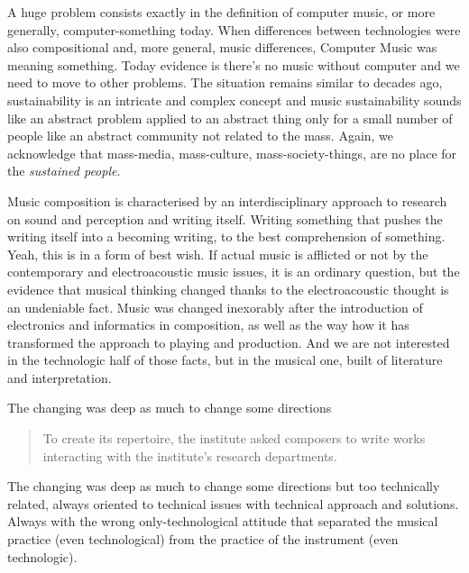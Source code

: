 \documentclass[twoside,a4paper]{article}
\begin{document}
A huge problem consists exactly in the definition of computer music, or more generally, computer-something today. When differences between technologies were also compositional and, more general, music differences, Computer Music was meaning something. Today evidence is there's no music without computer and we need to move to other problems. The situation remains similar to decades ago, sustainability is an intricate and complex concept and music sustainability sounds like an abstract problem applied to an abstract thing only for a small number of people like an abstract community not related to the mass. Again, we acknowledge that mass-media, mass-culture, mass-society-things, are no place for the \emph{sustained people}.

Music composition is characterised by an interdisciplinary approach to research on sound and perception and writing itself. Writing something that pushes the writing itself into a becoming writing, to the best comprehension of something. Yeah, this is in a form of best wish. If actual music is afflicted or not by the contemporary and electroacoustic music issues, it is an ordinary question, but the evidence that musical thinking changed thanks to the electroacoustic thought is an undeniable fact. Music was changed inexorably after the introduction of electronics and informatics in composition, as well as the way how it has transformed the approach to playing and production. And we are not interested in the technologic half of those facts, but in the musical one, built of literature and interpretation.

The changing was deep as much to change some directions

\begin{quote}
To create its repertoire, the institute asked composers to write works interacting with the institute’s research departments\cite{lem16}.
\end{quote}

The changing was deep as much to change some directions but too technically related, always oriented to technical issues with technical approach and solutions. Always with the wrong only-technological attitude that separated the musical practice (even technological) from the practice of the instrument (even technologic). 

\end{document}

